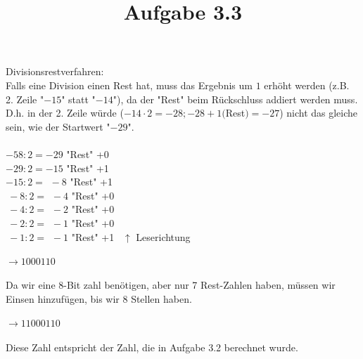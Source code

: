 \documentclass[paper, a4]{article}
\title{Aufgabe 3.3}
\begin{document}
\maketitle
Divisionsrestverfahren:\\
Falls eine Division einen Rest hat, muss das Ergebnis um $1$ erh\"oht werden (z.B. 2. Zeile "$-15$" statt "$-14$"), da der "Rest" beim R\"uckschluss addiert werden muss. D.h. in der 2. Zeile w\"urde ($-14 \cdot 2 = -28; -28 + 1($Rest$) = -27$) nicht das gleiche sein, wie der Startwert "$-29$".\\
\\
$-58 : 2 = -29$ "Rest" +0 \\
$-29 : 2 = -15$ "Rest" +1 \\
$-15 : 2 =\hspace{5pt} -8$ "Rest" +1 \\
$~-8 : 2 =\hspace{5pt} -4$ "Rest" +0 \\
$~-4 : 2 =\hspace{5pt} -2$ "Rest" +0 \\
$~-2 : 2 =\hspace{5pt} -1$ "Rest" +0 \\
$~-1 : 2 =\hspace{5pt} -1$ "Rest" +1 ~$\uparrow$ Leserichtung\\
\\
$\rightarrow 1000110$\\
\\
Da wir eine 8-Bit zahl ben\"otigen, aber nur 7 Rest-Zahlen haben, m\"ussen wir Einsen hinzuf\"ugen, bis wir 8 Stellen haben.\\
\\
$\rightarrow 11000110$\\
\\
Diese Zahl entspricht der Zahl, die in Aufgabe 3.2 berechnet wurde.
\end{document}
